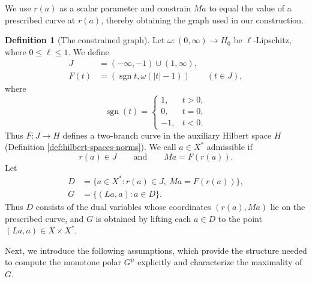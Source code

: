 \documentclass[11pt]{article}
\newcommand{\sgn}{\operatorname{sgn}}
\theoremstyle{definition}
\newtheorem{definition}{Definition}
\theoremstyle{remark}
\begin{document}
We use $r(a)$ as a scalar parameter and constrain $Ma$ to equal the value of a prescribed curve at $r(a)$, thereby obtaining the graph used in our construction. 



\begin{definition}[The constrained graph]
\label{def:construction-graph}
Let $\omega:(0,\infty)\to H_0$ be $\ell$-Lipschitz, where $0\le\ell\le1$. We define 
\[
\begin{aligned}
J&=(-\infty,-1)\cup(1,\infty),\\
F(t)&=(\sgn t,\omega(|t|-1))\qquad(t\in J), 
\end{aligned}
\]
where \[
\operatorname{sgn}(t)=
\begin{cases}
1, & t>0,\\
0, & t=0,\\
-1, & t<0.
\end{cases}
\] 
Thus $F:J\to H$ defines a two-branch curve in the auxiliary Hilbert
space $H$ (Definition \ref{def:hilbert-spaces-norms}). We call $a\in X^*$ admissible if
\[
r(a)\in J
\qquad\text{and}\qquad
Ma=F(r(a)).
\]
Let
\begin{equation}
\begin{aligned}
D&=\{a\in X^*:r(a)\in J,\ Ma=F(r(a))\},\\
G&=\{(La,a):a\in D\}.
\end{aligned}
\label{eq:abs-full-graph}
\end{equation}
Thus $D$ consists of the dual variables whose coordinates
$(r(a),Ma)$ lie on the prescribed curve, and $G$ is obtained by
lifting each $a\in D$ to the point $(La,a)\in X\times X^*$.







\end{definition}




Next, we introduce the following assumptions, which provide the structure needed to compute the monotone polar $G^\mu$ explicitly and characterize the maximality of $G$. 
\end{document}

